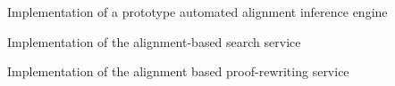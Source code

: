\begin{workpackage}
\begin{wpdelivs}
  \begin{wpdeliv}[due=48,id=automatedalignment,dissem=PU,nature=DEM,lead=Imt,task=aligntheories]{Implementation of a prototype automated alignment inference engine}\end{wpdeliv}
  
  \begin{wpdeliv}[due=48,id=alignsearch,dissem=PU,nature=DEM,lead=Fau,task=alignsearch]{Implementation of the alignment-based search service}\end{wpdeliv}
  
  \begin{wpdeliv}[due=48,id=alignproofrewr,dissem=PU,nature=DEM,lead=Bol,task=alignproofs]{Implementation of the alignment based proof-rewriting service}\end{wpdeliv}
\end{wpdelivs}
\end{workpackage}

